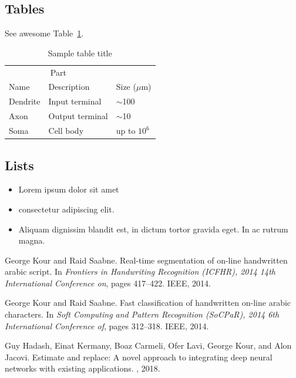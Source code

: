 \documentclass{article}
\begin{document}
\subsection{Tables}
\lipsum[12]
See awesome Table~\ref{tab:table}.

\begin{table}
 \caption{Sample table title}
  \centering
  \begin{tabular}{lll}
    \toprule
    \multicolumn{2}{c}{Part}                   \\
    \cmidrule(r){1-2}
    Name     & Description     & Size ($\mu$m) \\
    \midrule
    Dendrite & Input terminal  & $\sim$100     \\
    Axon     & Output terminal & $\sim$10      \\
    Soma     & Cell body       & up to $10^6$  \\
    \bottomrule
  \end{tabular}
  \label{tab:table}
\end{table}

\subsection{Lists}
\begin{itemize}
\item Lorem ipsum dolor sit amet
\item consectetur adipiscing elit. 
\item Aliquam dignissim blandit est, in dictum tortor gravida eget. In ac rutrum magna.
\end{itemize}


  


\begin{thebibliography}{1}

George Kour and Raid Saabne.
\newblock Real-time segmentation of on-line handwritten arabic script.
\newblock In {\em Frontiers in Handwriting Recognition (ICFHR), 2014 14th
  International Conference on}, pages 417--422. IEEE, 2014.

George Kour and Raid Saabne.
\newblock Fast classification of handwritten on-line arabic characters.
\newblock In {\em Soft Computing and Pattern Recognition (SoCPaR), 2014 6th
  International Conference of}, pages 312--318. IEEE, 2014.

Guy Hadash, Einat Kermany, Boaz Carmeli, Ofer Lavi, George Kour, and Alon
  Jacovi.
\newblock Estimate and replace: A novel approach to integrating deep neural
  networks with existing applications.
, 2018.

\end{thebibliography}
\end{document}
